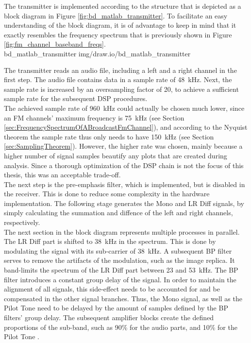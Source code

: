 The transmitter is implemented according to the structure that is depicted as a block diagram in Figure \ref{fig:bd_matlab_transmitter}.
To facilitate an easy understanding of the block diagram, it is of advantage to keep in mind that it exactly resembles the frequency spectrum that is previously shown in Figure \ref{fig:fm_channel_baseband_freqs}.\\

 {bd_matlab_transmitter} {img/draw.io/bd_matlab_transmitter}

The transmitter reads an audio file, including a left and a right channel in the first step.
The audio file contains data in a sample rate of 48~kHz.
Next, the sample rate is increased by an oversampling factor of 20, to achieve a sufficient sample rate for the subsequent DSP procedures.\\

The achieved sample rate of 960~kHz could actually be chosen much lower, since an FM channels' maximum frequency is 75~kHz (see Section \ref{sec:FrequencySpectrumOfABroadcastFmChannel}), and according to the Nyquist theorem the sample rate thus only needs to have 150~kHz (see Section \ref{sec:SamplingTheorem}).
However, the higher rate was chosen, mainly because a higher number of signal samples beautify any plots that are created during analysis.
Since a thorough optimization of the DSP chain is not the focus of this thesis, this was an acceptable trade-off.\\

The next step is the pre-emphasis filter, which is implemented, but is disabled in the receiver.
This is done to reduce some complexity in the hardware implementation.
The following stage generates the Mono and LR Diff signals, by simply calculating the summation and diffence of the left and right channels, respectively.\\

The next section in the block diagram represents multiple processes in parallel.
The LR Diff part is shifted to 38~kHz in the spectrum.
This is done by modulating the signal with its sub-carrier of 38~kHz.
A subsequent BP filter serves to remove the artifacts of the modulation, such as the image replica.
It band-limits the spectrum of the LR Diff part between 23 and 53~kHz.
The BP filter introduces a constant group delay of the signal.
In order to maintain the alignment of all signals, this side-effect needs to be accounted for and be compensated in the other signal branches.
Thus, the Mono signal, as well as the Pilot Tone need to be delayed by the amount of samples defined by the BP filters' group delay.
The subsequent amplifier blocks create the defined proportions of the sub-band, such as 90\% for the audio parts, and 10\% for the Pilot Tone \cite{FmMultiplexingForStereo}.\\

